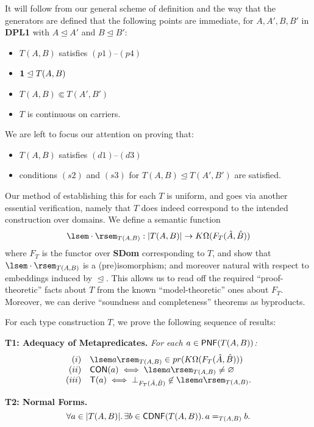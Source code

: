 It will follow from our general scheme of definition and the way that the generators are defined that the following points are immediate, for $A, A', B, B'$ in {\bf DPL1} with $A \trianglelefteq A'$ and $B \trianglelefteq B'$:
\begin{itemize}
\item $T(A,B)$ satisfies $(p1)$--$(p4)$
\item ${\bf 1} \trianglelefteq T(A,B)$
\item $T(A,B) \Subset T(A',B')$
\item $T$ is continuous on carriers.
\end{itemize}
We are left to focus our attention on proving that:
\begin{itemize}
\item $T(A,B)$ satisfies $(d1)$--$(d3)$
\item conditions $(s2)$ and $(s3)$ for $T(A,B) \trianglelefteq T(A',B')$ are satisfied.
\end{itemize}

Our method of establishing this for each $T$ is uniform, and goes via another essential verification, namely that $T$ does indeed correspond to the intended construction over domains. We define a semantic function
\[ \lsem \cdot \rsem_{T(A,B)} : |T(A,B)| \rightarrow K\Omega (F_{T}(\hat{A}, \hat{B})) \]
where $F_{T}$ is the functor over {\bf SDom} corresponding to $T$, and show 
that $\lsem \cdot \rsem_{T(A,B)}$ is a (pre)isomorphism; and moreover natural with respect to embeddings induced by $\trianglelefteq$. 
This allows us to read off the required ``proof-theoretic'' facts about $T$ from the known ``model-theoretic'' ones about $F_{T}$. 
Moreover, we can derive ``soundness and completeness'' theorems as byproducts.

For each type construction $T$, we prove the following sequence of results:

{\bf T1: Adequacy of Metapredicates.} {\it For each $a \in {\sf PNF}(T(A,B))$:}
\[\begin{array}{rl}
(i)   & \lsem a \rsem_{T(A,B)} \in pr(K\Omega (F_{T}(\hat{A},\hat{B}))) \\
(ii)  & {\sf CON}(a) \; \Longleftrightarrow \; \lsem a \rsem_{T(A,B)} \neq \varnothing \\
(iii) & {\sf T}(a) \; \Longleftrightarrow \; \bot_{F_{T}(\hat{A},\hat{B})} \not\in \lsem a \rsem_{T(A,B)}. 
\end{array} \]

{\bf T2: Normal Forms.} 
\[ \forall a \in |T(A,B)|. \, \exists b \in {\sf CDNF}(T(A,B)) . \, a =_{T(A,B)} b. \]

